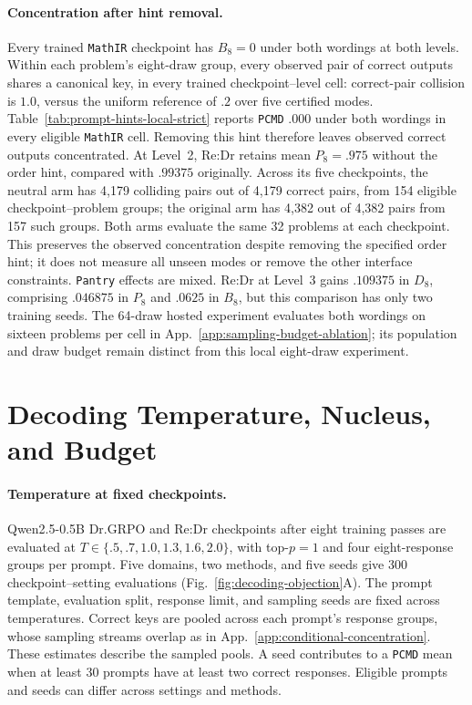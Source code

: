 \documentclass{article}
\newcommand{\1}{\mathbf 1}
\newcommand{\pmd}{\texttt{PCMD}}
\theoremstyle{remark}
\theoremstyle{definition}
\theoremstyle{plain}
\begin{document}
\paragraph{Concentration after hint removal.}
Every trained \texttt{MathIR} checkpoint has $B_8=0$ under both wordings at both levels.
Within each problem's eight-draw group, every observed pair of correct
outputs shares a canonical key, in every trained checkpoint--level cell:
correct-pair collision is $1.0$, versus the
uniform reference of $.2$ over five certified modes.
Table~\ref{tab:prompt-hints-local-strict} reports \pmd{} $.000$ under both
wordings in every eligible \texttt{MathIR} cell. Removing this hint therefore leaves
observed correct outputs concentrated. At Level~2, Re:Dr retains mean $P_8=.975$ without the order hint, compared with $.99375$
originally. Across its five checkpoints, the neutral arm has 4,179 colliding
pairs out of 4,179 correct pairs, from 154 eligible checkpoint--problem
groups; the original arm has 4,382 out of 4,382 pairs from 157 such groups.
Both arms evaluate the same 32 problems at each checkpoint. This preserves
the observed concentration despite removing the specified order hint; it does
not measure all unseen modes or remove the other interface constraints.
\texttt{Pantry} effects are mixed. Re:Dr at Level~3 gains $.109375$ in $D_8$,
comprising $.046875$ in $P_8$ and $.0625$ in $B_8$, but this comparison has only
two training seeds. The 64-draw hosted experiment evaluates both wordings on sixteen problems
per cell in
App.~\ref{app:sampling-budget-ablation}; its population and draw budget
remain distinct from this local eight-draw experiment.


\section{Decoding Temperature, Nucleus, and Budget}
\label{app:decoding-objection}

\paragraph{Temperature at fixed checkpoints.}
Qwen2.5-0.5B Dr.GRPO and Re:Dr checkpoints after eight training passes are
evaluated at $T\in\{.5,.7,1.0,1.3,1.6,2.0\}$, with top-$p=1$ and four
eight-response groups per prompt. Five domains, two methods, and five seeds
give 300 checkpoint--setting evaluations (Fig.~\ref{fig:decoding-objection}A).
The prompt template, evaluation split, response limit, and sampling seeds
are fixed across temperatures. Correct keys are pooled across each prompt's response groups, whose
sampling streams overlap as in App.~\ref{app:conditional-concentration}.
These estimates describe the sampled pools. A seed contributes to a
\pmd{} mean when at least 30 prompts have at least two correct responses. Eligible prompts and seeds
can differ across settings and methods.
\end{document}
